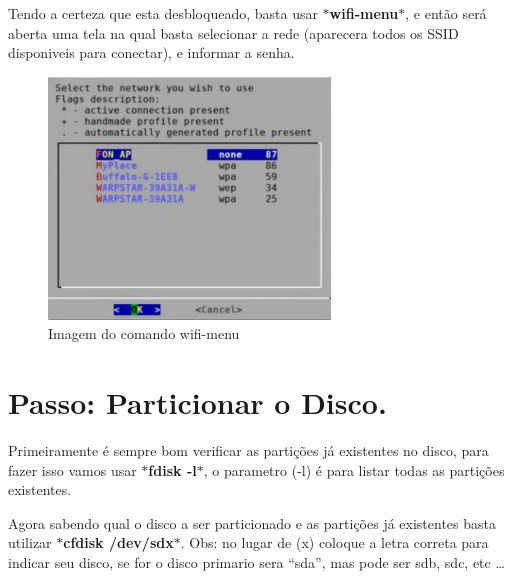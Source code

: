 \documentclass[12pt, a4paper] {article}
\begin{document}
		Tendo a certeza que esta desbloqueado, basta usar \textbf{$\ast$wifi-menu$\ast$}, e então será aberta uma tela na qual basta selecionar a rede (aparecera todos os SSID disponiveis para conectar), e informar a senha.\\
		\begin{figure}[htb]
			\centering
			\includegraphics[width=75mm]{images/wifi-menu.jpg}
			\caption{Imagem do comando wifi-menu}
			\label{fig:Wifi-menu}
		\end{figure}

	\section{Passo: Particionar o Disco.}

	Primeiramente é sempre bom verificar as partições já existentes no disco, para fazer isso vamos usar \textbf{$\ast$fdisk -l$\ast$}, o parametro (-l) é para listar todas as partições existentes.

	Agora sabendo qual o disco a ser particionado e as partições já existentes basta utilizar \textbf{$\ast$cfdisk /dev/sdx$\ast$}. Obs: no lugar de (x) coloque a letra correta para indicar seu disco, se for o disco primario sera ``sda'', mas pode ser sdb, sdc, etc \ldots
\end{document}

